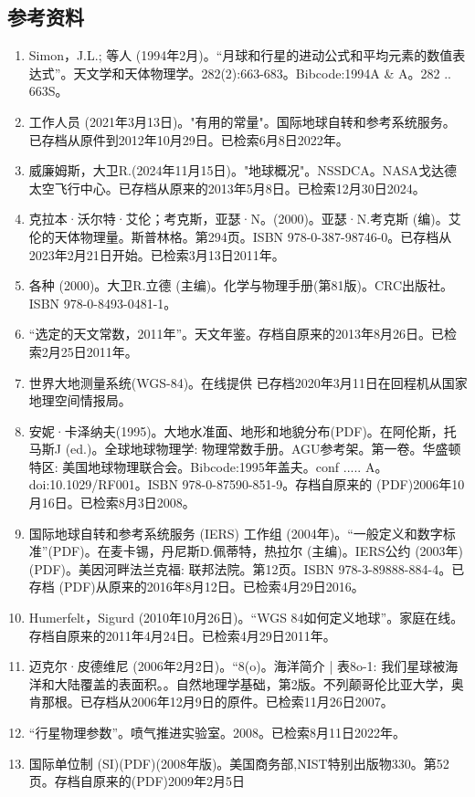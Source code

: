 \subsection{参考资料}
\begin{enumerate}
\item Simon，J.L.; 等人 (1994年2月)。“月球和行星的进动公式和平均元素的数值表达式”。天文学和天体物理学。282(2):663-683。Bibcode:1994A & A。282 .. 663S。
\item 工作人员 (2021年3月13日)。"有用的常量"。国际地球自转和参考系统服务。已存档从原件到2012年10月29日。已检索6月8日2022年。
\item 威廉姆斯，大卫R.(2024年11月15日)。"地球概况"。NSSDCA。NASA戈达德太空飞行中心。已存档从原来的2013年5月8日。已检索12月30日2024。
\item 克拉本·沃尔特·艾伦；考克斯，亚瑟·N。(2000)。亚瑟·N.考克斯 (编)。艾伦的天体物理量。斯普林格。第294页。ISBN 978-0-387-98746-0。已存档从2023年2月21日开始。已检索3月13日2011年。
\item 各种 (2000)。大卫R.立德 (主编)。化学与物理手册(第81版)。CRC出版社。ISBN 978-0-8493-0481-1。
\item “选定的天文常数，2011年”。天文年鉴。存档自原来的2013年8月26日。已检索2月25日2011年。
\item 世界大地测量系统(WGS-84)。在线提供 已存档2020年3月11日在回程机从国家地理空间情报局。
\item 安妮·卡泽纳夫(1995)。大地水准面、地形和地貌分布(PDF)。在阿伦斯，托马斯J (ed.)。全球地球物理学: 物理常数手册。AGU参考架。第一卷。华盛顿特区: 美国地球物理联合会。Bibcode:1995年盖夫。conf ..... A。doi:10.1029/RF001。ISBN  978-0-87590-851-9。存档自原来的 (PDF)2006年10月16日。已检索8月3日2008。
\item 国际地球自转和参考系统服务 (IERS) 工作组 (2004年)。“一般定义和数字标准”(PDF)。在麦卡锡，丹尼斯D.佩蒂特，热拉尔 (主编)。IERS公约 (2003年)(PDF)。美因河畔法兰克福: 联邦法院。第12页。ISBN  978-3-89888-884-4。已存档 (PDF)从原来的2016年8月12日。已检索4月29日2016。
\item Humerfelt，Sigurd (2010年10月26日)。“WGS 84如何定义地球”。家庭在线。存档自原来的2011年4月24日。已检索4月29日2011年。
\item 迈克尔·皮德维尼 (2006年2月2日)。“8(o)。海洋简介 | 表8o-1: 我们星球被海洋和大陆覆盖的表面积。。自然地理学基础，第2版。不列颠哥伦比亚大学，奥肯那根。已存档从2006年12月9日的原件。已检索11月26日2007。
\item “行星物理参数”。喷气推进实验室。2008。已检索8月11日2022年。
\item 国际单位制 (SI)(PDF)(2008年版)。美国商务部,NIST特别出版物330。第52页。存档自原来的(PDF)2009年2月5日

\end{enumerate}
